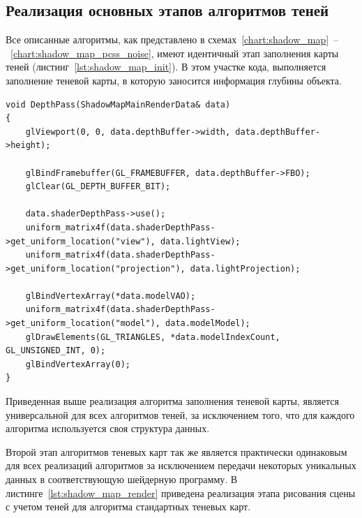 \subsection{Реализация основных этапов алгоритмов теней}

Все описанные алгоритмы, как представлено в
схемах~\ref{chart:shadow_map}~--~\ref{chart:shadow_map_pcss_noise},
имеют идентичный этап заполнения карты теней (листинг~\ref{lst:shadow_map_init}).
В этом участке кода, выполняется заполнение теневой карты, в которую заносится
информация глубины объекта.

\begin{center}
\captionsetup{justification=centering, singlelinecheck=off}
\begin{lstlisting}[label=lst:shadow_map_init, caption=Алгоритм заполнения теневой карты]
void DepthPass(ShadowMapMainRenderData& data)
{
    glViewport(0, 0, data.depthBuffer->width, data.depthBuffer->height);

    glBindFramebuffer(GL_FRAMEBUFFER, data.depthBuffer->FBO);
    glClear(GL_DEPTH_BUFFER_BIT);

    data.shaderDepthPass->use();
    uniform_matrix4f(data.shaderDepthPass->get_uniform_location("view"), data.lightView);
    uniform_matrix4f(data.shaderDepthPass->get_uniform_location("projection"), data.lightProjection);

    glBindVertexArray(*data.modelVAO);
    uniform_matrix4f(data.shaderDepthPass->get_uniform_location("model"), data.modelModel);
    glDrawElements(GL_TRIANGLES, *data.modelIndexCount, GL_UNSIGNED_INT, 0);
    glBindVertexArray(0);
}
\end{lstlisting}
\end{center}

Приведенная выше реализация алгоритма заполнения теневой карты, является универсальной для
всех алгоритмов теней, за исключением того, что для каждого алгоритма используется
своя структура данных.

Второй этап алгоритмов теневых карт так же является практически одинаковым для всех реализаций
алгоритмов за исключением передачи некоторых уникальных данных в соответствующую шейдерную
программу. В листинге~\ref{lst:shadow_map_render} приведена реализация этапа рисования сцены с учетом теней для
алгоритма стандартных теневых карт.

